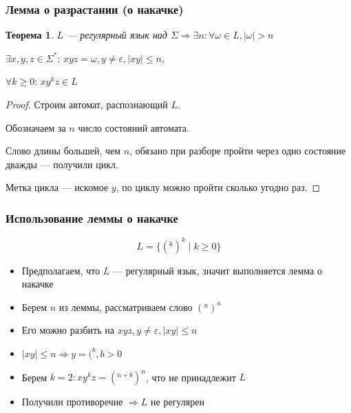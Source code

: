 \documentclass{beamer}
\newtheorem{rutheorem}{Теорема}
\begin{document}
\begin{frame}[fragile]
  \transwipe[direction=90]
  \frametitle{Лемма о разрастании (о накачке)}
  \begin{rutheorem}
  $L$ --- регулярный язык над $\Sigma \Rightarrow \exists n: \forall \omega \in L, | \omega | > n$
  
    $\exists x, y, z \in \Sigma^*: \, xyz = \omega, y \neq \varepsilon, |xy| \leq n,$
    
     $ \forall k \geq 0: \, x y^k z \in L$
  \end{rutheorem}
  
  \begin{proof}
  Строим автомат, распознающий $L$.
  
  Обозначаем за $n$ число состояний автомата.
  
  Слово длины большей, чем $n$, обязано при разборе пройти через одно состояние дважды --- получили цикл. 

  Метка цикла --- искомое $y$, по циклу можно пройти сколько угодно раз.
  
  \end{proof}

\end{frame}


\begin{frame}[fragile]
  \transwipe[direction=90]
  \frametitle{Использование леммы о накачке}

  \[ L = \{ (^k )^k \mid k \geq 0\} \]

  \begin{itemize}
    \item Предполагаем, что $L$ --- регулярный язык, значит выполняется лемма о накачке
    \item Берем $n$ из леммы, рассматриваем слово $(^n )^n$ 
    \item Его можно разбить на $xyz, y \neq \varepsilon, |xy| \leq n$
    \item $|xy| \leq n \Rightarrow y = (^b, b > 0$
    \item Берем $k = 2: xy^kz = (^{n+b} )^n$, что не принадлежит $L$
    \item Получили противоречие $\Rightarrow L$  не регулярен
  \end{itemize}
  
\end{frame}
\end{document}
